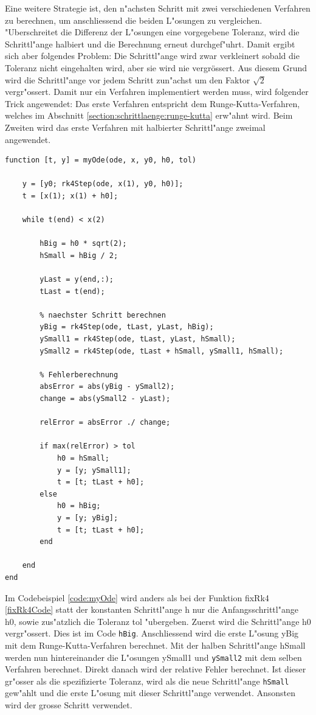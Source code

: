 \begin{refsection}
Eine weitere Strategie ist, den n"achsten Schritt mit zwei verschiedenen Verfahren zu berechnen, um anschliessend die beiden L"osungen zu vergleichen.
"Uberschreitet die Differenz der L"osungen eine vorgegebene Toleranz, wird die Schrittl"ange halbiert und die Berechnung erneut durchgef"uhrt.
Damit ergibt sich aber folgendes Problem: Die Schrittl"ange wird zwar verkleinert sobald die Toleranz nicht eingehalten wird, aber sie wird nie vergrössert.
Aus diesem Grund wird die Schrittl"ange vor jedem Schritt zun"achst um den Faktor $\sqrt{2}$ vergr"ossert. 
Damit nur ein Verfahren implementiert werden muss, wird folgender Trick angewendet: 
Das erste Verfahren entspricht dem Runge-Kutta-Verfahren, welches im Abschnitt \ref{section:schrittlaenge:runge-kutta} erw"ahnt wird.
Beim Zweiten wird das erste Verfahren mit halbierter Schrittl"ange zweimal angewendet. 


\begin{lstlisting}[style=Matlab, caption=Variable Schrittl"ange, captionpos=b, label=code:myOde] 
function [t, y] = myOde(ode, x, y0, h0, tol)
    
    y = [y0; rk4Step(ode, x(1), y0, h0)]; 
    t = [x(1); x(1) + h0];
    
    while t(end) < x(2)
        
        hBig = h0 * sqrt(2);
        hSmall = hBig / 2;
        
        yLast = y(end,:);
        tLast = t(end);
        
        % naechster Schritt berechnen
        yBig = rk4Step(ode, tLast, yLast, hBig);
        ySmall1 = rk4Step(ode, tLast, yLast, hSmall);
        ySmall2 = rk4Step(ode, tLast + hSmall, ySmall1, hSmall);
        
        % Fehlerberechnung
        absError = abs(yBig - ySmall2);
        change = abs(ySmall2 - yLast);
        
        relError = absError ./ change;
        
        if max(relError) > tol
            h0 = hSmall;
            y = [y; ySmall1];
            t = [t; tLast + h0];
        else
            h0 = hBig;
            y = [y; yBig]; 
            t = [t; tLast + h0];           
        end
         
    end
end

\end{lstlisting}

Im Codebeispiel \ref{code:myOde} wird anders als bei der Funktion fixRk4 \ref{fixRk4Code} statt der konstanten Schrittl"ange h nur die Anfangsschrittl"ange h0, sowie zus"atzlich die Toleranz tol "ubergeben.
Zuerst wird die Schrittl"ange h0 vergr"ossert.
Dies ist im Code \texttt{hBig}.
Anschliessend wird die erste L"osung yBig mit dem Runge-Kutta-Verfahren berechnet.
Mit der halben Schrittl"ange hSmall werden nun hintereinander die L"osungen ySmall1 und \texttt{ySmall2} mit dem selben Verfahren berechnet.
Direkt danach wird der relative Fehler berechnet.
Ist dieser gr"osser als die spezifizierte Toleranz, wird als die neue Schrittl"ange \texttt{hSmall} gew"ahlt und die erste L"osung mit dieser Schrittl"ange verwendet.
Ansonsten wird der grosse Schritt verwendet.


\end{refsection}
